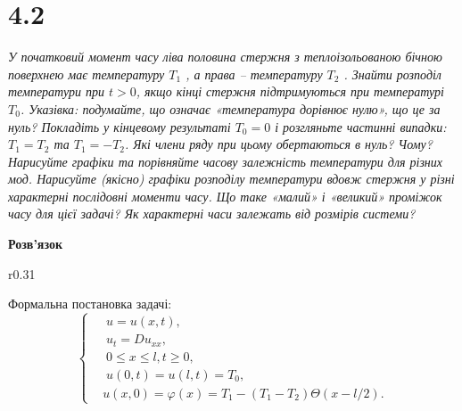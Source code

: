 

%


\clearpage

\section[Задача №4.2]{4.2}

\textit{У початковий момент часу ліва половина стержня з теплоізольованою бічною поверхнею має температуру $T_1$ , а права -- температуру $T_2$ . Знайти розподіл температури при $t> 0$, якщо кінці стержня підтримуються при температурі $T_0$. Указівка: подумайте, що означає «температура дорівнює нулю», що це за нуль? Покладіть у кінцевому результаті $T_0 = 0$ і розгляньте частинні випадки: $T_1 = T_2$ та $T_1 = -T_2$. Які члени ряду при цьому обертаються в нуль? Чому? Нарисуйте графіки та порівняйте часову залежність температури для     різних мод. Нарисуйте (якісно) графіки розподілу     температури вдовж стержня у різні характерні послідовні моменти часу. Що таке «малий» і «великий» проміжок часу для цієї задачі? Як характерні часи залежать від розмірів системи?}

\begin{center}
    \textbf{Розв'язок}
\end{center}

\begin{wrapfigure}{r}{0.31\textwidth}
    \centering
\end{wrapfigure}


Формальна постановка задачі:
\begin{equation} \label{cond4,2}
    \left\{ \begin{aligned}
        &\;u = u(x,t), \\
        &\;u_{t} = D u_{xx}, \\
        &\;0 \leq x \leq l, t \geq 0, \\
        &\;u(0,t) = u(l,t) = T_0,\\
        &u(x,0) = \varphi(x) = T_1 - (T_1 - T_2)\Theta(x - l/2).
    \end{aligned} \right.
\end{equation}
\vspace{1cm}

